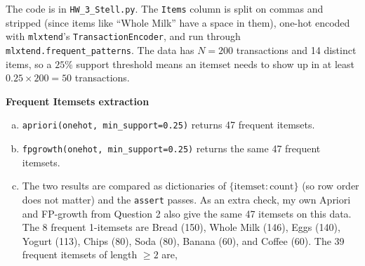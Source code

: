 \documentclass[12pt,letterpaper, onecolumn]{exam}
\begin{document}
\begin{questions}
    \begin{solution}

        The code is in \texttt{HW\_3\_Stell.py}. The \texttt{Items} column is split on commas and stripped (since items like ``Whole Milk'' have a space in them), one-hot encoded with \texttt{mlxtend}'s \texttt{TransactionEncoder}, and run through \texttt{mlxtend.frequent\_patterns}. The data has $N=200$ transactions and 14 distinct items, so a $25\%$ support threshold means an itemset needs to show up in at least $0.25\times200=50$ transactions.

        \textbf{Frequent Itemsets extraction}
        \begin{enumerate}[a.)]
            \item \texttt{apriori(onehot, min\_support=0.25)} returns 47 frequent itemsets.
            \item \texttt{fpgrowth(onehot, min\_support=0.25)} returns the same 47 frequent itemsets.
            \item The two results are compared as dictionaries of $\{\text{itemset}:\text{count}\}$ (so row order does not matter) and the \texttt{assert} passes. As an extra check, my own Apriori and FP-growth from Question 2 also give the same 47 itemsets on this data. The 8 frequent 1-itemsets are Bread (150), Whole Milk (146), Eggs (140), Yogurt (113), Chips (80), Soda (80), Banana (60), and Coffee (60). The 39 frequent itemsets of length $\geq2$ are,
        \end{enumerate}


\end{solution}
\end{questions}
\end{document}
